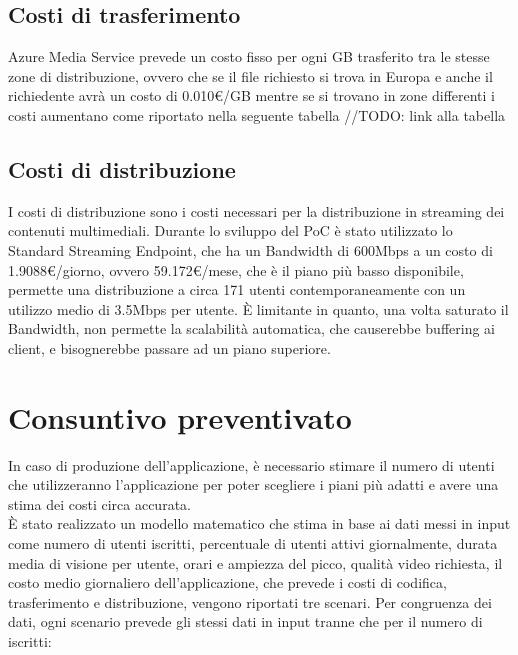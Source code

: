 \subsection{Costi di trasferimento}
Azure Media Service prevede un costo fisso per ogni GB trasferito tra le stesse zone di distribuzione, ovvero che se il file richiesto si trova in Europa e anche il richiedente avrà un costo di 0.010€/GB mentre se si trovano in zone differenti i costi aumentano come riportato nella seguente tabella //TODO: link alla tabella

\subsection{Costi di distribuzione}
\label{subsec:costi-distribuzione}
I costi di distribuzione sono i costi necessari per la distribuzione in streaming dei contenuti multimediali. Durante lo sviluppo del PoC è stato utilizzato lo Standard Streaming Endpoint, che ha un Bandwidth di 600Mbps a un costo di 1.9088€/giorno, ovvero 59.172€/mese, che è il piano più basso disponibile, permette una distribuzione a circa 171 utenti contemporaneamente con un utilizzo medio di 3.5Mbps per utente. È limitante in quanto, una volta saturato il Bandwidth, non permette la scalabilità automatica, che causerebbe buffering ai client, e bisognerebbe passare ad un piano superiore.\\

\section{Consuntivo preventivato}
In caso di produzione dell'applicazione, è necessario stimare il numero di utenti che utilizzeranno l'applicazione per poter scegliere i piani più adatti e avere una stima dei costi circa accurata.\\
È stato realizzato un modello matematico che stima in base ai dati messi in input come numero di utenti iscritti, percentuale di utenti attivi giornalmente, durata media di visione per utente, orari e ampiezza del picco, qualità video richiesta, il costo medio giornaliero dell'applicazione, che prevede i costi di codifica, trasferimento e distribuzione, vengono riportati tre scenari.
Per congruenza dei dati, ogni scenario prevede gli stessi dati in input tranne che per il numero di iscritti:

